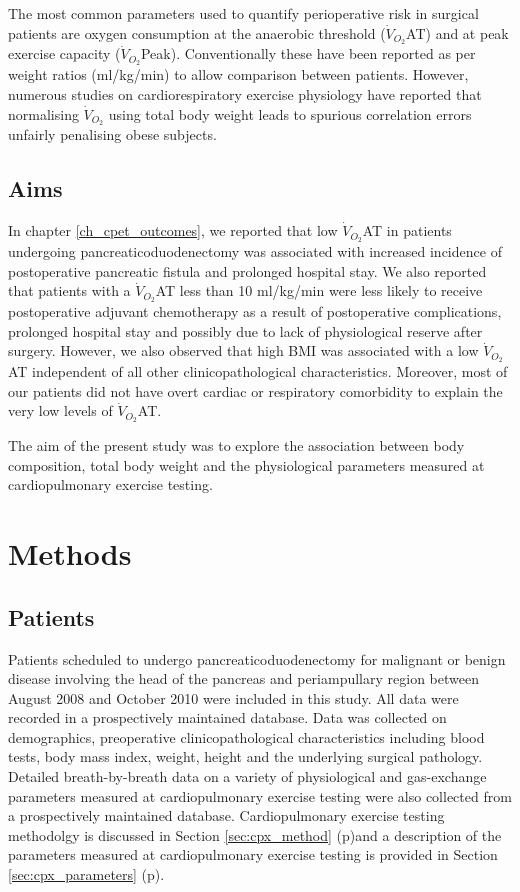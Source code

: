 The most common parameters used to quantify perioperative risk in surgical patients are oxygen consumption at the anaerobic threshold ($\dot{V}_{O_2}$AT) and at peak exercise capacity ($\dot{V}_{O_2}$Peak). Conventionally these have been reported as per weight ratios (ml/kg/min) to allow comparison between patients. However, numerous studies on cardiorespiratory exercise physiology have reported that normalising $\dot{V}_{O_2}$ using total body weight leads to spurious correlation errors unfairly penalising obese subjects.\parencite{seltzer_body_1940, tanner_fallacy_1949, toth_examination_1993, batterham_modeling_1999, goran_total_2000, krachler_cardiopulmonary_2014} 

\subsection{Aims}
In chapter \ref{ch_cpet_outcomes}, we reported that low $\dot{V}_{O_2}$AT in patients undergoing pancreaticoduodenectomy was associated with increased incidence of postoperative pancreatic fistula and prolonged hospital stay. We also reported that patients with a $\dot{V}_{O_2}$AT less than 10 ml/kg/min were less likely to receive postoperative adjuvant chemotherapy as a result of postoperative complications, prolonged hospital stay and possibly due to lack of physiological reserve after surgery. However, we also observed that high BMI was associated with a low $\dot{V}_{O_2}$AT independent of all other clinicopathological characteristics. Moreover, most of our patients did not have overt cardiac or respiratory comorbidity to explain the very low levels of $\dot{V}_{O_2}$AT.

The aim of the present study was to explore the association between body composition, total body weight and the physiological parameters measured at cardiopulmonary exercise testing.

\clearpage
\section{Methods}

\subsection{Patients}
Patients scheduled to undergo pancreaticoduodenectomy for malignant or benign disease involving the head of the pancreas and periampullary region between August 2008 and October 2010 were included in this study. All data were recorded in a prospectively maintained database. Data was collected on demographics, preoperative clinicopathological characteristics including blood tests, body mass index, weight, height and the underlying surgical pathology. Detailed breath-by-breath data on a variety of physiological and gas-exchange parameters measured at cardiopulmonary exercise testing were also collected from a prospectively maintained database. Cardiopulmonary exercise testing methodolgy is discussed in Section \ref{sec:cpx_method} (p\pageref{sec:cpx_parameters})and a description of the parameters measured at cardiopulmonary exercise testing is provided in Section \ref{sec:cpx_parameters} (p\pageref{sec:cpx_parameters}).

